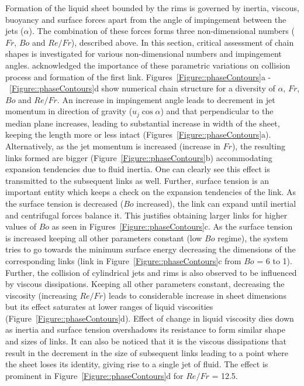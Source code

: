 \documentclass{jfm}
\begin{document}
Formation of the liquid sheet bounded by the rims is governed by inertia, viscous, buoyancy and surface forces apart from the angle of impingement between the jets ($\alpha$). The combination of these forces forms three non-dimensional numbers ($Fr$, $Bo$ and $Re/Fr$), described above. In this section, critical assessment of chain shapes is investigated for various non-dimensional numbers and impingement angles. \cite{yang2014liquid} acknowledged the importance of these parametric variations on collision process and formation of the first link. Figures~\ref{Figure::phaseContours}a -~\ref{Figure::phaseContours}d show numerical chain structure for a diversity of $\alpha$, $Fr$, $Bo$ and $Re/Fr$. An increase in impingement angle leads to decrement in jet momentum in direction of gravity ($u_j\cos\alpha$) and that perpendicular to the median plane increases, leading to substantial increase in width of the sheet, keeping the length more or less intact (Figures~\ref{Figure::phaseContours}a). Alternatively, as the jet momentum is increased (increase in $Fr$), the resulting links formed are bigger (Figure~\ref{Figure::phaseContours}b) accommodating expansion tendencies due to fluid inertia. One can clearly see this effect is transmitted to the subsequent links as well. Further, surface tension is an important entity which keeps a check on the expansion tendencies of the link. As the surface tension is decreased ($Bo$ increased), the link can expand until inertial and centrifugal forces balance it. This justifies obtaining larger links for higher values of $Bo$ as seen in Figures~\ref{Figure::phaseContours}c. As the surface tension is increased keeping all other parameters constant (low $Bo$ regime), the system tries to go towards the minimum surface energy decreasing the dimensions of the corresponding links (link in Figure~\ref{Figure::phaseContours}c from $Bo$ = 6 to 1). Further, the collision of cylindrical jets and rims is also observed to be influenced by viscous dissipations. Keeping all other parameters constant, decreasing the viscosity (increasing $Re/Fr$) leads to considerable increase in sheet dimensions but its effect saturates at lower ranges of liquid viscosities (Figure~\ref{Figure::phaseContours}d). Effect of change in liquid viscosity dies down as inertia and surface tension overshadows its resistance to form similar shape and sizes of links. It can also be noticed that it is the viscous dissipations that result in the decrement in the size of subsequent links leading to a point where the sheet loses its identity, giving rise to a single jet of fluid. The effect is prominent in Figure~\ref{Figure::phaseContours}d for $Re/Fr$ = 12.5.\\
\end{document}
